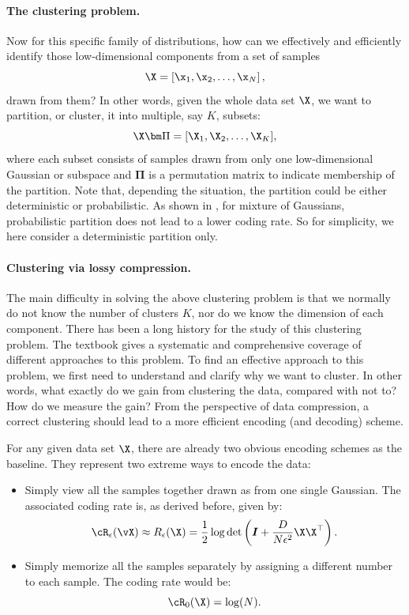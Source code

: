 \documentclass[../../book-main.tex]{subfiles}
\begin{document}
\paragraph{The clustering problem.}
Now for this specific family of distributions, how can we effectively and efficiently identify those low-dimensional components from a set of samples
\begin{equation}
	\X = \left[\x_1, \x_2, \ldots, \x_N\right],
\end{equation}
drawn from them? In other words, given the whole data set $\X$, we want to partition, or cluster, it into multiple, say $K$, subsets:
\begin{equation}
	\X\bm \Pi = [\X_1, \X_2, \dots, \X_K],
\end{equation}
where each subset consists of samples drawn from only one low-dimensional Gaussian or subspace and $\bm \Pi$ is a permutation matrix to indicate membership of the partition. Note that, depending the situation, the partition could be either deterministic or probabilistic. As shown in \cite{ma2007segmentation}, for mixture of Gaussians, probabilistic partition does not lead to a lower coding rate. So for simplicity, we here consider a deterministic partition only.

\paragraph{Clustering via lossy compression.}
The main difficulty in solving the above clustering problem is that we normally do not know the number of clusters $K$, nor do we know the dimension of each component. There has been a long history for the study of this clustering problem. The textbook \cite{GPCA} gives a systematic and comprehensive coverage of different approaches to this problem. To find an effective approach to this problem, we first need to understand and clarify why we want to cluster. In other words, what exactly do we gain from clustering the data, compared with not to? How do we measure the gain? From the perspective of data compression, a correct clustering should lead to a more efficient encoding (and decoding) scheme.

For any given data set $\X$, there are already two obvious encoding schemes as the baseline. They represent two extreme ways to encode the data:
\begin{itemize}
	\item Simply view all the samples together drawn as from one single Gaussian. The associated coding rate is, as derived before, given by:
	      \begin{equation}
		      \cR_{\epsilon}(\vX) \approx R_{\epsilon}(\X) = \frac{1}{2} \log \det \left(\boldsymbol{I} + \frac{D}{N\epsilon^2} \X\X^\top \right).
	      \end{equation}
	\item Simply memorize all the samples separately by assigning a different number to each sample. The coding rate would be:
	      \begin{equation}
		      \cR_0(\X) = \log(N).
	      \end{equation}
\end{itemize}
\end{document}
